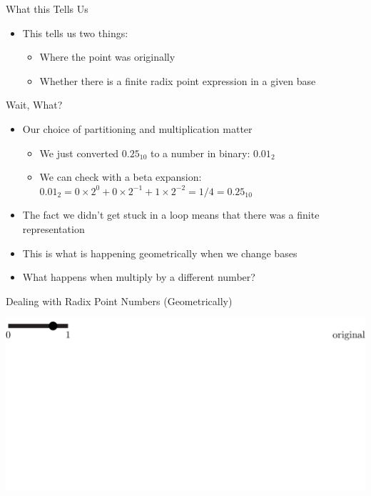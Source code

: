 \documentclass{beamer}
\begin{document}
\begin{frame}{What this Tells Us}
  \begin{itemize}
    \item This tells us two things:
    \begin{itemize}
      \item Where the point was originally
      \item Whether there is a finite radix point expression in a given base
    \end{itemize}
  \end{itemize}
\end{frame}

\begin{frame}{Wait, What?}
  \begin{itemize}
    \item Our choice of partitioning and multiplication matter
    \begin{itemize}
      \item We just converted $0.25_{10}$ to a number in binary: $0.01_2$
      \item We can check with a beta expansion: $0.01_2 = 0\times2^{0} + 0\times2^{-1} + 1\times2^{-2} = 1/4 = 0.25_{10}$
    \end{itemize}
    \item The fact we didn't get stuck in a loop means that there was a finite representation
    \item This is what is happening geometrically when we change bases \pause
    \item What happens when multiply by a different number?
  \end{itemize}
\end{frame}

\begin{frame}{Dealing with Radix Point Numbers (Geometrically)}
  \begin{example}
    \includegraphics[width=\textwidth,height=0.75\textheight]{images/Ternary/1}
  \end{example}
\end{frame}
\end{document}
